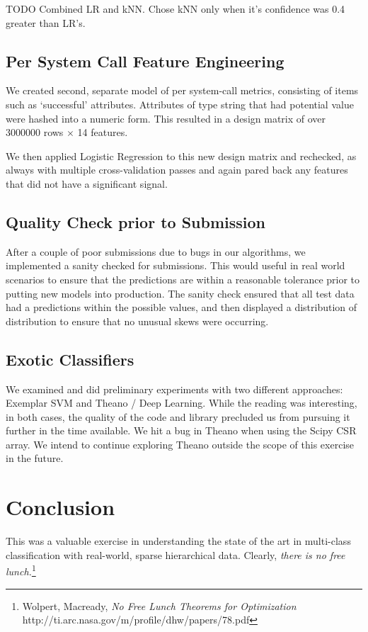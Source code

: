\documentclass[11pt, oneside]{article}   	%
\begin{document}
TODO
Combined LR and kNN. Chose kNN only when it's confidence was 0.4 greater than LR's.


\subsection*{Per System Call Feature Engineering}

We created second, separate model of per system-call metrics, consisting of items such as `successful' attributes. Attributes of type string that had potential value were hashed into a numeric form. This resulted in a design matrix of over 
3000000 rows $\times$ 14 features.

We then applied Logistic Regression to this new design matrix and rechecked, as always with multiple cross-validation passes and again pared back any features that did not have a significant signal.

\subsection*{Quality Check prior to Submission}

After a couple of poor submissions due to bugs in our algorithms, we implemented a sanity checked for submissions. This would useful in real world scenarios to ensure that the predictions are within a reasonable tolerance prior to putting new models into production. The sanity check ensured that all test data had a predictions within the possible values, and then displayed a distribution of distribution to ensure that no unusual skews were occurring.

\subsection*{Exotic Classifiers}

We examined and did preliminary experiments with two different approaches: Exemplar SVM and Theano / Deep Learning. While the reading was interesting, in both cases, the quality of the code and library precluded us from pursuing it further in the time available. We hit a bug in Theano when using the Scipy CSR array. We intend to continue exploring Theano outside the scope of this exercise in the future.


\section*{Conclusion}

This was a valuable exercise in understanding the state of the art in multi-class classification with real-world, sparse hierarchical data. Clearly, \emph{there is no free lunch.}\footnote{Wolpert, Macready, \emph{No Free Lunch Theorems for Optimization} http://ti.arc.nasa.gov/m/profile/dhw/papers/78.pdf}
\end{document}
